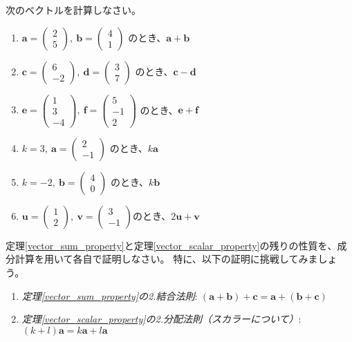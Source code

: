 \begin{quiz}
次のベクトルを計算しなさい。
\begin{enumerate}
\item $\bm{a} = \begin{pmatrix} 2 \\ 5 \end{pmatrix},\ \bm{b} = \begin{pmatrix} 4 \\ 1 \end{pmatrix}$ のとき、$\bm{a} + \bm{b}$
\item $\bm{c} = \begin{pmatrix} 6 \\ -2 \end{pmatrix},\ \bm{d} = \begin{pmatrix} 3 \\ 7 \end{pmatrix}$ のとき、$\bm{c} - \bm{d}$
\item $\bm{e} = \begin{pmatrix} 1 \\ 3 \\ -4 \end{pmatrix},\ \bm{f} = \begin{pmatrix} 5 \\ -1 \\ 2 \end{pmatrix}$ のとき、$\bm{e} + \bm{f}$
\item $k = 3,\ \bm{a} = \begin{pmatrix} 2 \\ -1 \end{pmatrix}$ のとき、$k\bm{a}$
\item $k = -2,\ \bm{b} = \begin{pmatrix} 4 \\ 0 \end{pmatrix}$ のとき、$k\bm{b}$
\item $\bm{u} = \begin{pmatrix} 1 \\ 2 \end{pmatrix},\ \bm{v} = \begin{pmatrix} 3 \\ -1 \end{pmatrix}$のとき、$2\bm{u} + \bm{v}$
\end{enumerate}
\end{quiz}

\begin{quiz}[定理の証明演習]
定理\ref{vector_sum_property}と定理\ref{vector_scalar_property}の残りの性質を、成分計算を用いて各自で証明しなさい。
特に、以下の証明に挑戦してみましょう。
\begin{enumerate}
\item \emph{定理\ref{vector_sum_property}の2.結合法則}: $(\bm{a} + \bm{b}) + \bm{c} = \bm{a} + (\bm{b} + \bm{c})$
\item \emph{定理\ref{vector_scalar_property}の2.分配法則（スカラーについて）}: $(k+l)\bm{a} = k\bm{a} + l\bm{a}$
\end{enumerate}
\end{quiz}